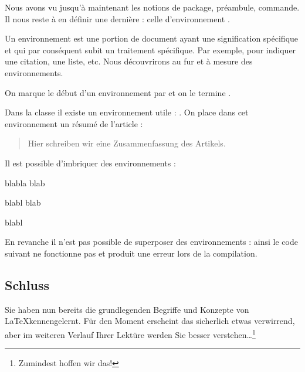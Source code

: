 Nous avons vu jusqu'à maintenant les notions de  package, préambule, commande. 
Il nous reste à en définir une dernière  : celle d'environnement .

Un environnement  est une portion de document ayant une signification spécifique et qui par conséquent subit un traitement spécifique. Par exemple, pour indiquer une citation, une liste, etc. Nous découvrirons au fur et à mesure  des environnements. 


On marque le début d'un environnement   par  et on le termine .




Dans la classe  il existe un environnement utile : . On place dans cet environnement un résumé de l'article :

\begin{latexcode}
\begin{abstract}
Hier schreiben wir eine Zusammenfassung des Artikels. 
\end{abstract}
\end{latexcode}


Il est possible d'imbriquer des environnements :

\begin{latexcode}
\begin{1}
blabla blab
\begin{2}
blabl blab
\end{2}
blabl
\end{1}
\end{latexcode}


En revanche il n'est pas possible de superposer des environnements : ainsi le code suivant ne fonctionne pas et produit une erreur lors de la compilation.



\subsection{Schluss}

Sie haben nun bereits die grundlegenden Begriffe und Konzepte von \LaTeX kennengelernt. Für den Moment erscheint das sicherlich etwas verwirrend, aber im weiteren Verlauf Ihrer Lektüre werden Sie besser verstehen\ldots\footnote{Zumindest hoffen wir das!}

